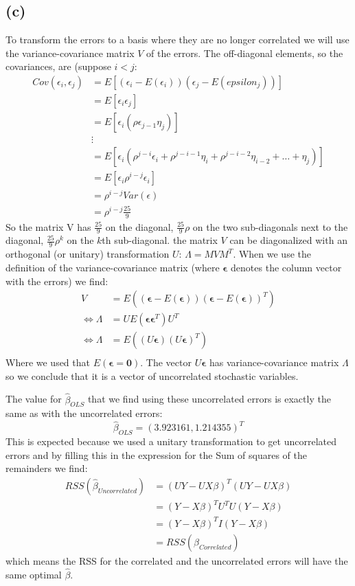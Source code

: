 \documentclass[a4paper]{article}
\begin{document}
\subsection*{(c)}
To transform the errors to a basis where they are no longer correlated we will use the variance-covariance matrix $V$ of the errors. 
The off-diagonal elements, so the covariances, are (suppose $i < j$:
\begin{align*}
	Cov(\epsilon_i, \epsilon_j) &= E[(\epsilon_i-E(\epsilon_i))(\epsilon_j-E(epsilon_j))]\\
				    &= E[\epsilon_i \epsilon_j]\\
				    &= E[\epsilon_i (\rho\epsilon_{j-1} \eta_j)]\\
				    &\vdots\\
				    &= E[\epsilon_i (\rho^{j-i} \epsilon_i + \rho^{j-i-1}\eta_i + \rho^{j-i-2}\eta_{i-2} + \ldots + \eta_j)]\\
				    &= E[\epsilon_i \rho^{i-j} \epsilon_i]\\
				    &= \rho^{i-j} Var(\epsilon)\\
				    &= \rho^{i-j} \frac{25}{9}
\end{align*}
So the matrix V has $ \frac{25}{9}$ on the diagonal, $ \frac{25}{9}\rho $ on the two sub-diagonals next to the diagonal, $ \frac{25}{9} \rho^k$ on the $k$th sub-diagonal.
the matrix $V$ can be diagonalized with an orthogonal (or unitary) transformation $U$: $\Lambda = MVM^T$. When we use the definition of the variance-covariance matrix (where $\mathbf{\epsilon}$ denotes the column vector with the errors) we find:
\begin{align*}
	V &= E( (\mathbf{\epsilon} - E(\mathbf{\epsilon})) (\mathbf{\epsilon} - E(\mathbf{\epsilon}))^T)\\
	\Leftrightarrow \Lambda &= U E( \mathbf{\epsilon} \mathbf{\epsilon}^T) U^T\\
	\Leftrightarrow \Lambda &= E( (U\mathbf{\epsilon})(U\mathbf{\epsilon})^T)\\
\end{align*}
Where we used that $E(\mathbf{\epsilon} = \mathbf{0})$. The vector $U \mathbf{\epsilon}$ has variance-covariance matrix $\Lambda$ so we conclude that it is a vector of uncorrelated stochastic variables.

The value for $\hat{\beta}_{OLS}$ that we find using these uncorrelated errors is exactly the same as with the uncorrelated errors:
\begin{equation*}
	\hat{\beta}_{OLS} = (3.923161, 1.214355)^T
\end{equation*}
This is expected because we used a unitary transformation to get uncorrelated errors and by filling this in the expression for the Sum of squares of the remainders we find:
\begin{align*}
	RSS(\hat{\beta}_{Uncorrelated}) &= (UY-UX\beta)^T(UY-UX\beta)\\
		   &= (Y-X\beta)^T U^T U (Y-X\beta)\\
		   &= (Y-X\beta)^T I (Y-X\beta)\\
		   &= RSS(\hat{\beta}_{Correlated})
\end{align*}
which means the RSS for the correlated and the uncorrelated errors will have the same optimal $\hat{\beta}$.
\end{document}
